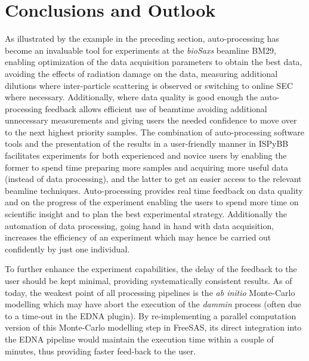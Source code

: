 \documentclass[preprint,pdf]{iucr}              %
\begin{document}
\section{Conclusions and Outlook}
As illustrated by the example in the preceding section, auto-processing has
become an invaluable tool for experiments at the \textit{bioSaxs} beamline BM29, 
enabling optimization of the
data acquisition parameters to obtain the best data, avoiding the effects of
radiation damage on the data, measuring additional dilutions where inter-particle 
scattering is observed or switching to online SEC where necessary. 
Additionally, where data quality is good enough the auto-processing feedback
allows efficient use of beamtime avoiding additional unnecessary measurements
and giving users the needed confidence to move over to the next highest priority
samples.
The combination of auto-processing software tools and
the presentation of the results in a user-friendly manner in ISPyBB facilitates
experiments for both experienced and novice users by enabling the former to
spend time preparing more samples and acquiring more useful data (instead of
data processing), and the latter to get an easier access to the relevant
beamline techniques.
Auto-processing provides real time feedback on data quality and on the progress 
of the experiment enabling the users to spend more time on scientific insight
and to plan the best experimental strategy.
Additionally the automation of data processing, going hand in hand with
data acquisition, increases the efficiency of an experiment
which may hence be carried out confidently by just one individual.

To further enhance the experiment capabilities, the delay of the feedback to the
user should be kept minimal, providing systematically consistent results.
As of today, the weakest point of all processing pipelines is the
\textit{ab initio} Monte-Carlo modelling which may have abort the
execution of the \textit{dammin} process (often due to a time-out in
the EDNA plugin).
By re-implementing a parallel computation version of this Monte-Carlo modelling
step in FreeSAS, its direct integration into the
EDNA pipeline would maintain the execution time within a couple of minutes,
thus providing faster feed-back to the user.

\end{document}
